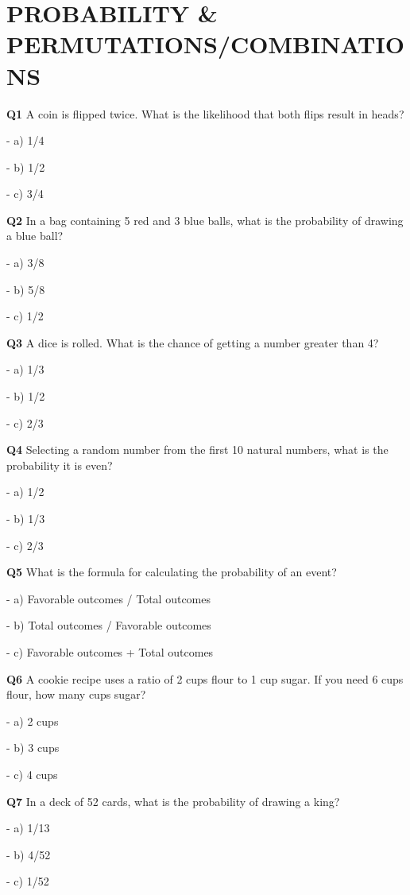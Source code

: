 \section{PROBABILITY & PERMUTATIONS/COMBINATIONS}

\textbf{Q1} A coin is flipped twice. What is the likelihood that both flips result in heads?\par
\quad - a) 1/4\par
\quad - b) 1/2\par
\quad - c) 3/4\par

\textbf{Q2} In a bag containing 5 red and 3 blue balls, what is the probability of drawing a blue ball?\par
\quad - a) 3/8\par
\quad - b) 5/8\par
\quad - c) 1/2\par

\textbf{Q3} A dice is rolled. What is the chance of getting a number greater than 4?\par
\quad - a) 1/3\par
\quad - b) 1/2\par
\quad - c) 2/3\par

\textbf{Q4} Selecting a random number from the first 10 natural numbers, what is the probability it is even?\par
\quad - a) 1/2\par
\quad - b) 1/3\par
\quad - c) 2/3\par

\textbf{Q5} What is the formula for calculating the probability of an event?\par
\quad - a) Favorable outcomes / Total outcomes\par
\quad - b) Total outcomes / Favorable outcomes\par
\quad - c) Favorable outcomes + Total outcomes\par

\textbf{Q6} A cookie recipe uses a ratio of 2 cups flour to 1 cup sugar. If you need 6 cups flour, how many cups sugar?\par
\quad - a) 2 cups\par
\quad - b) 3 cups\par
\quad - c) 4 cups\par

\textbf{Q7} In a deck of 52 cards, what is the probability of drawing a king?\par
\quad - a) 1/13\par
\quad - b) 4/52\par
\quad - c) 1/52\par


